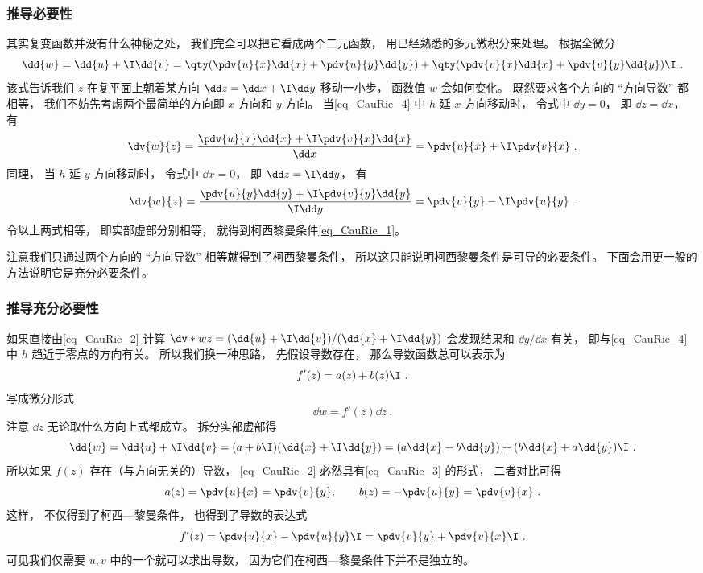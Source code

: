 \subsubsection{推导必要性}
其实复变函数并没有什么神秘之处， 我们完全可以把它看成两个二元函数， 用已经熟悉的多元微积分来处理。 根据全微分
\begin{equation}\label{eq_CauRie_2}
\dd{w} = \dd{u} + \I \dd{v} = \qty(\pdv{u}{x} \dd{x} + \pdv{u}{y} \dd{y}) + \qty(\pdv{v}{x} \dd{x} + \pdv{v}{y} \dd{y})\I~.
\end{equation}
该式告诉我们 $z$ 在复平面上朝着某方向 $\dd z = \dd x + \I \dd y$ 移动一小步， 函数值 $w$ 会如何变化。 既然要求各个方向的 “方向导数” 都相等， 我们不妨先考虑两个最简单的方向即 $x$ 方向和 $y$ 方向。 当\autoref{eq_CauRie_4} 中 $h$ 延 $x$ 方向移动时， 令式中 $\dd y = 0$， 即 $\dd z = \dd x$， 有
\begin{equation}
\dv{w}{z} = \frac{\pdv{u}{x} \dd{x} +  \I\pdv{v}{x} \dd{x}}{\dd x} = \pdv{u}{x} +  \I\pdv{v}{x}~.
\end{equation}
同理， 当 $h$ 延 $y$ 方向移动时， 令式中 $\dd x = 0$， 即 $\dd z = \I\dd y$， 有
\begin{equation}
\dv{w}{z} = \frac{\pdv{u}{y} \dd{y} + \I\pdv{v}{y} \dd{y}}{\I \dd y} = \pdv{v}{y} -\I \pdv{u}{y}~.
\end{equation}
令以上两式相等， 即实部虚部分别相等， 就得到柯西黎曼条件\autoref{eq_CauRie_1}。

注意我们只通过两个方向的 “方向导数” 相等就得到了柯西黎曼条件， 所以这只能说明柯西黎曼条件是可导的必要条件。 下面会用更一般的方法说明它是充分必要条件。

\subsubsection{推导充分必要性}
如果直接由\autoref{eq_CauRie_2} 计算 $\dv*{w}{z} = (\dd{u} + \I \dd{v})/(\dd{x} + \I \dd{y})$ 会发现结果和 $\dd{y}/\dd{x}$ 有关， 即与\autoref{eq_CauRie_4} 中 $h$ 趋近于零点的方向有关。 所以我们换一种思路， 先假设导数存在， 那么导数函数总可以表示为
\begin{equation}
f'(z) = a(z) + b(z)\I~.
\end{equation}
写成微分形式
\begin{equation}
\dd{w} = f'(z)\dd{z}~.
\end{equation}
注意 $\dd z$ 无论取什么方向上式都成立。 拆分实部虚部得
\begin{equation}\label{eq_CauRie_3}
\dd{w} = \dd{u} + \I \dd{v} = (a + b\I)(\dd{x} + \I\dd{y}) = (a \dd{x} - b\dd{y}) + (b \dd{x} + a\dd{y})\I~.
\end{equation}
所以如果 $f(z)$ 存在（与方向无关的）导数， \autoref{eq_CauRie_2} 必然具有\autoref{eq_CauRie_3} 的形式， 二者对比可得
\begin{equation}
a(z) = \pdv{u}{x} = \pdv{v}{y}, \qquad
b(z) = -\pdv{u}{y} = \pdv{v}{x}~.
\end{equation}
这样， 不仅得到了柯西—黎曼条件， 也得到了导数的表达式
\begin{equation}
f'(z) = \pdv{u}{x} -\pdv{u}{y} \I = \pdv{v}{y} + \pdv{v}{x}\I~.
\end{equation}
可见我们仅需要 $u, v$ 中的一个就可以求出导数， 因为它们在柯西—黎曼条件下并不是独立的。

